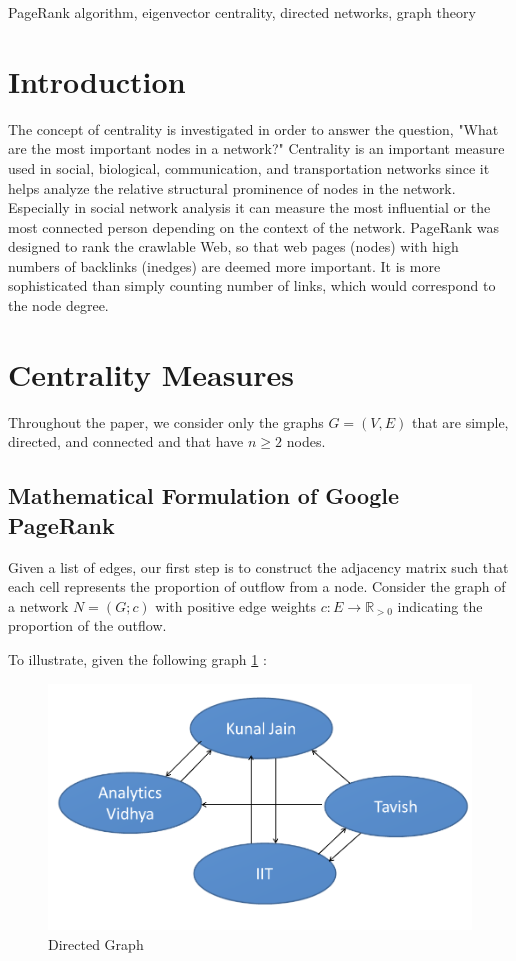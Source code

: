 \documentclass[10pt]{siamltex}
\begin{document}
\begin{keywords} PageRank algorithm, eigenvector centrality, directed networks, graph theory
\end{keywords}


\section{Introduction}

The concept of centrality is investigated in order to answer the question, "What are the most important nodes in a network?" Centrality is an important measure used in social, biological, communication, and transportation networks since it helps analyze the relative structural prominence of nodes in the network. Especially in social network analysis it can measure the most influential or the most connected person depending on the context of the network.  PageRank was designed to rank the crawlable Web, so that web pages (nodes) with high numbers of backlinks (inedges) are deemed more important.  It is more sophisticated than simply counting number of links, which would correspond to the node degree.

\section{Centrality Measures}
Throughout the paper, we consider only the graphs $G = (V,E)$ that are simple, directed, and connected and that have $n \geq 2$ nodes. 
\subsection{Mathematical Formulation of Google PageRank}
Given a list of edges, our first step is to construct the adjacency matrix such that each cell represents the proportion of outflow from a node.  Consider the graph of a network $N = (G;c)$ with positive edge weights $c: E \rightarrow \mathbb{R}_{> 0}$ indicating the proportion of the outflow.

To illustrate, given the following graph \ref{fig:directed1} :

\begin{figure}[ht]
\begin{center}
\includegraphics[width=0.56\columnwidth]{directed1}
\end{center}
\caption{Directed Graph \cite{analyticsvidhya} }
\label{fig:directed1}
\end{figure}
\end{document}
